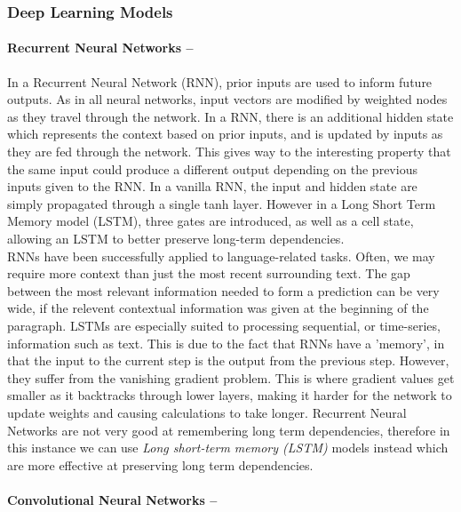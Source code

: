 \documentclass[12pt,a4paper]{article}
\begin{document}
\subsubsection{Deep Learning Models}
\paragraph{Recurrent Neural Networks --}
In a Recurrent Neural Network (RNN), prior inputs are used to inform future outputs. As in all neural networks, input vectors are modified by weighted nodes as they travel through the network. In a RNN, there is an additional hidden state which represents the context based on prior inputs, and is updated by inputs as they are fed through the network. This gives way to the interesting property that the same input could produce a different output depending on the previous inputs given to the RNN. In a vanilla RNN, the input and hidden state are simply propagated through a single tanh layer. However in a Long Short Term Memory model (LSTM), three gates are introduced, as well as a cell state, allowing an LSTM to better preserve long-term dependencies.\\

RNNs have been successfully applied to language-related tasks. Often, we may require more context than just the most recent surrounding text. The gap between the most relevant information needed to form a prediction can be very wide, if the relevent contextual information was given at the beginning of the paragraph. LSTMs are especially suited to processing sequential, or time-series, information such as text. This is due to the fact that RNNs have a 'memory', in that the input to the current step is the output from the previous step. However, they suffer from the vanishing gradient problem. This is where gradient values get smaller as it backtracks through lower layers, making it harder for the network to update weights and causing calculations to take longer. Recurrent Neural Networks are not very good at remembering long term dependencies, therefore in this instance we can use \textit{Long short-term memory (LSTM)} models \cite{hochreiter1997long} instead which are more effective at preserving long term dependencies.



\paragraph{Convolutional Neural Networks --}
\end{document}
